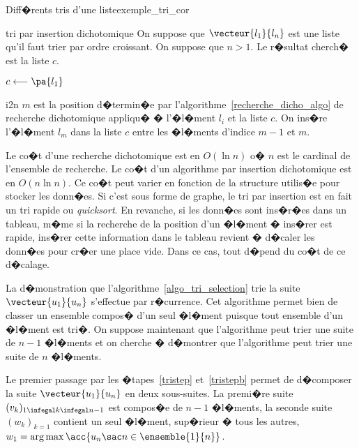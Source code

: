 \begin{xexempleprog2}{Diff�rents tris d'une liste}{exemple_tri_cor}
            \begin{xalgorithm}{tri par insertion dichotomique}
            On suppose que $\vecteur{l_1}{l_n}$ est une liste qu'il faut trier par ordre croissant. 
            On suppose que $n > 1$. Le r�sultat cherch� est la liste $c$.
            
            $c \longleftarrow \pa{l_1}$ 
            
            \begin{xfor2}{i}{2}{n}
                    $m$ est la position d�termin�e par l'algorithme~\ref{recherche_dicho_algo} de recherche dichotomique
                    appliqu� � l'�l�ment $l_i$ et la liste $c$. On ins�re l'�l�ment $l_m$ dans la liste $c$ entre
                    les �l�ments d'indice $m-1$ et $m$.
            \end{xfor2}
            
            \end{xalgorithm}

Le co�t d'une recherche dichotomique est en $O(\ln n)$ o� $n$ est le cardinal de l'ensemble de recherche. Le co�t d'un algorithme par insertion dichotomique est en $O(n \ln n)$. Ce co�t peut varier en fonction de la structure utilis�e pour stocker les donn�es. Si c'est sous forme de graphe, le tri par insertion est en fait un tri rapide ou \emph{quicksort}.  En revanche, si les donn�es sont ins�r�es dans un tableau, m�me si la recherche de la position d'un �l�ment � ins�rer est rapide, ins�rer cette information dans le tableau revient � d�caler les donn�es pour cr�er une place vide. Dans ce cas, tout d�pend du co�t de ce d�calage.


La d�monstration que l'algorithme~\ref{algo_tri_selection} trie la suite $\vecteur{u_1}{u_n}$ s'effectue par r�currence. Cet algorithme permet bien de classer un ensemble compos� d'un seul �l�ment puisque tout ensemble d'un �l�ment est tri�. On suppose maintenant que l'algorithme peut trier une suite de $n-1$ �l�ments et on cherche � d�montrer que l'algorithme peut trier une suite de $n$ �l�ments. 

Le premier passage par les �tapes~\ref{tristep} et~\ref{tristepb} permet de d�composer la suite $\vecteur{u_1}{u_n}$ en deux sous-suites. La premi�re suite $(v_k)_{1 \infegal k \infegal n-1}$ est compos�e de $n-1$ �l�ments, la seconde suite $(w_k)_{k = 1}$ contient un seul �l�ment, sup�rieur � tous les autres, $w_1 = \arg \max \acc{u_n \sac n \in \ensemble{1}{n}}$. 


\end{xexempleprog2}
